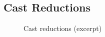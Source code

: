 \documentclass[a4paper]{llncs}
\begin{document}
\subsection{Cast Reductions}
\label{sec:special-reductions}

\begin{figure}[tp]
\begin{mathpar}

\end{mathpar}
  \caption{Cast reductions (excerpt)}
  \label{fig:cast-reductions}
\end{figure}
\end{document}
